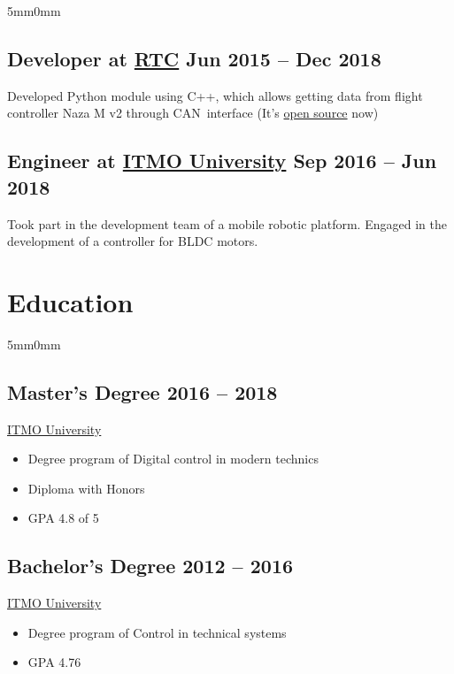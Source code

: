 \documentclass[10pt]{article}
\newcommand{\lmvalue}{5mm}
\newcommand{\rmvalue}{0mm}
\begin{document}
\begin{changemargin}{\lmvalue}{\rmvalue}
		\subsection*{Developer at \href{https://er.rtc.ru/en/}{RTC}
		\hfill {\color{gray}Jun 2015 – Dec 2018}}

		Developed Python module using C++, which allows getting data from flight controller Naza M v2 through
		CAN~interface (It's \href{https://github.com/viktorvorobev/NazaCanDecoder}{open source} now)

		\subsection*{Engineer at \href{https://en.itmo.ru/}{ITMO University}
		\hfill {\color{gray}Sep 2016 – Jun 2018}}

		Took part in the development team of a mobile robotic platform.
        Engaged in the development of a controller for BLDC motors.

    \end{changemargin}

    \section*{Education}
    \begin{changemargin}{\lmvalue}{\rmvalue}

        \begin{minipage}[t]{0.52\linewidth}
            \subsection*{Master's Degree \hfill {\color{gray}2016 – 2018}}
            \href{https://en.itmo.ru/}{ITMO University}
            \begin{itemize}
                \item Degree program of Digital control in modern technics
                \item Diploma with Honors
                \item GPA 4.8 of 5
            \end{itemize}
        \end{minipage}
        \hfill%
        \begin{minipage}[t]{0.42\linewidth}
            \subsection*{Bachelor's Degree \hfill {\color{gray}2012 – 2016}}
            \href{https://en.itmo.ru/}{ITMO University}
            \begin{itemize}
                \item Degree program of Control in technical systems
                \item GPA 4.76
            \end{itemize}
        \end{minipage}
    \end{changemargin}
\end{document}
